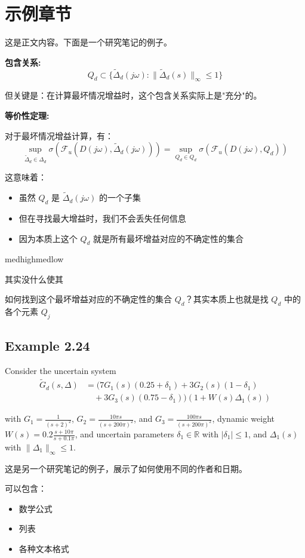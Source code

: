 \documentclass[12pt]{article}
\begin{document}
\section{示例章节}

这是正文内容。下面是一个研究笔记的例子。

\begin{researchnote}[author=JC, date=2025-10-16]
\textbf{包含关系:}
\[
Q_d \subset \{\tilde{\Delta}_d(j\omega) : \|\tilde{\Delta}_d(s)\|_\infty \leq 1\}
\]

但关键是：在计算最坏情况增益时，这个包含关系实际上是"充分"的。

\textbf{等价性定理:}

对于最坏情况增益计算，有：
\[
\sup_{\tilde{\Delta}_d \in \Delta_d} \sigma(\mathcal{F}_u(D(j\omega), \tilde{\Delta}_d(j\omega))) 
= \sup_{Q_d \in Q_d} \sigma(\mathcal{F}_u(D(j\omega), Q_d))
\]

这意味着：
\begin{itemize}
\item 虽然 $Q_d$ 是 $\tilde{\Delta}_d(j\omega)$ 的一个子集
\item 但在寻找最大增益时，我们不会丢失任何信息
\item 因为本质上这个 $Q_d$ 就是所有最坏增益对应的不确定性的集合
\end{itemize}
\end{researchnote}

medhighmedlow
\begin{researchnote}[date=2025-10-16]
    其实没什么使其
\end{researchnote}
\begin{questionnote}[author=JC, date=2025-10-16, class=]
如何找到这个最坏增益对应的不确定性的集合 $Q_d$？其实本质上也就是找 $Q_d$ 中的各个元素 $Q_j$
\end{questionnote}

\subsection{Example 2.24}

Consider the uncertain system
\begin{align*}
\tilde{G}_d(s,\Delta) &= (7G_1(s)(0.25+\delta_1) + 3G_2(s)(1-\delta_1) \\
&\quad + 3G_3(s)(0.75-\delta_1))(1+W(s)\Delta_1(s))
\end{align*}

with $G_1 = \frac{1}{(s+2)^2}$, $G_2 = \frac{10\pi s}{(s+200\pi)^2}$, and $G_3 = \frac{100\pi s}{(s+200\pi)^2}$, dynamic weight $W(s) = 0.2\frac{s+10\pi}{s+0.1\pi}$, and uncertain parameters $\delta_1 \in \mathbb{R}$ with $|\delta_1| \leq 1$, and $\Delta_1(s)$ with $\|\Delta_1\|_\infty \leq 1$.

\begin{researchnote}[author=张三, date=2025-10-18]
这是另一个研究笔记的例子，展示了如何使用不同的作者和日期。

可以包含：
\begin{itemize}
\item 数学公式
\item 列表
\item 各种文本格式
\end{itemize}
\end{researchnote}
\end{document}

